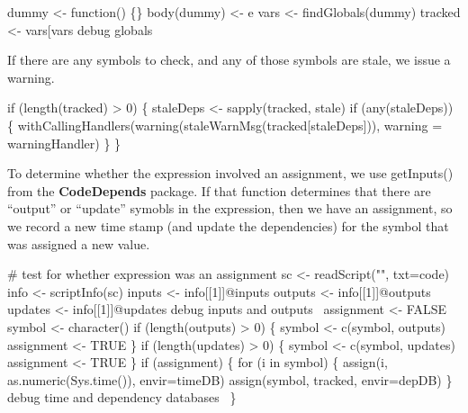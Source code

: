\documentclass[a4paper]{article}%
\newcommand{\pkg}[1]{{\bf #1}}
\begin{document}
\nwenddocs{}\endmoddef\nwstartdeflinemarkup{}\nwenddeflinemarkup
dummy <- function() \{\}
body(dummy) <- e
vars <- findGlobals(dummy)
tracked <- vars[vars %
\LA{}debug globals~{\nwtagstyle{}}\RA{}
\nwendcode{}\nwdocspar

If there are any symbols to check, and any of those symbols
are stale, we issue a warning.

\nwenddocs{}\endmoddef\nwstartdeflinemarkup{}\nwenddeflinemarkup
if (length(tracked) > 0) \{
    staleDeps <- sapply(tracked, stale)
    if (any(staleDeps)) \{
        withCallingHandlers(warning(staleWarnMsg(tracked[staleDeps])),
                            warning = warningHandler)
    \}
\}
\nwendcode{}\nwdocspar

To determine whether the expression involved an assignment, we
use {\Tt{}getInputs()\nwendquote} from the \pkg{CodeDepends} package.
If that function determines that there are ``output'' or ``update''
symobls in the expression, then we have an assignment,
so we record a new time stamp (and update the dependencies) for the
symbol that was assigned a new value.

\nwenddocs{}\endmoddef\nwstartdeflinemarkup{}\nwenddeflinemarkup
# test for whether expression was an assignment
sc <- readScript("", txt=code)
info <- scriptInfo(sc)
inputs <- info[[1]]@inputs
outputs <- info[[1]]@outputs
updates <- info[[1]]@updates
\LA{}debug inputs and outputs~{\nwtagstyle{}}\RA{}
assignment <- FALSE
symbol <- character()
if (length(outputs) > 0) \{
    symbol <- c(symbol, outputs)
    assignment <- TRUE
\}
if (length(updates) > 0) \{
    symbol <- c(symbol, updates)
    assignment <- TRUE    
\}
if (assignment) \{
    for (i in symbol) \{
        assign(i, as.numeric(Sys.time()), envir=timeDB)
        assign(symbol, tracked, envir=depDB)
    \}
    \LA{}debug time and dependency databases~{\nwtagstyle{}}\RA{}
\}
\nwendcode{}\nwdocspar
\end{document}
